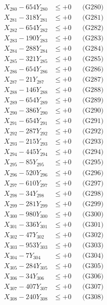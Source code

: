 \documentclass[a4paper,10pt]{article}
\begin{document}
{\begin{align}
X_{280} - 654Y_{280} &\leq +0 && \text{(G280)} \\
\allowbreak
X_{281} - 318Y_{281} &\leq +0 && \text{(G281)} \\
X_{282} - 654Y_{282} &\leq +0 && \text{(G282)} \\
X_{283} - 190Y_{283} &\leq +0 && \text{(G283)} \\
X_{284} - 288Y_{284} &\leq +0 && \text{(G284)} \\
X_{285} - 321Y_{285} &\leq +0 && \text{(G285)} \\
X_{286} - 654Y_{286} &\leq +0 && \text{(G286)} \\
X_{287} - 21Y_{287} &\leq +0 && \text{(G287)} \\
X_{288} - 146Y_{288} &\leq +0 && \text{(G288)} \\
X_{289} - 654Y_{289} &\leq +0 && \text{(G289)} \\
X_{290} - 386Y_{290} &\leq +0 && \text{(G290)} \\
\allowbreak
X_{291} - 654Y_{291} &\leq +0 && \text{(G291)} \\
X_{292} - 287Y_{292} &\leq +0 && \text{(G292)} \\
X_{293} - 215Y_{293} &\leq +0 && \text{(G293)} \\
X_{294} - 445Y_{294} &\leq +0 && \text{(G294)} \\
X_{295} - 85Y_{295} &\leq +0 && \text{(G295)} \\
X_{296} - 520Y_{296} &\leq +0 && \text{(G296)} \\
X_{297} - 610Y_{297} &\leq +0 && \text{(G297)} \\
X_{298} - 34Y_{298} &\leq +0 && \text{(G298)} \\
X_{299} - 281Y_{299} &\leq +0 && \text{(G299)} \\
X_{300} - 980Y_{300} &\leq +0 && \text{(G300)} \\
\allowbreak
X_{301} - 336Y_{301} &\leq +0 && \text{(G301)} \\
X_{302} - 47Y_{302} &\leq +0 && \text{(G302)} \\
X_{303} - 953Y_{303} &\leq +0 && \text{(G303)} \\
X_{304} - 7Y_{304} &\leq +0 && \text{(G304)} \\
X_{305} - 284Y_{305} &\leq +0 && \text{(G305)} \\
X_{306} - 34Y_{306} &\leq +0 && \text{(G306)} \\
X_{307} - 407Y_{307} &\leq +0 && \text{(G307)} \\
X_{308} - 240Y_{308} &\leq +0 && \text{(G308)} \\

\end{align}}
\end{document}
